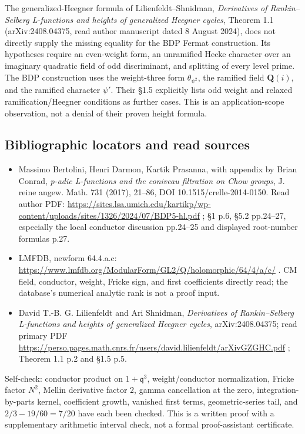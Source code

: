 \documentclass[11pt,a4paper]{article}
\providecommand{\tightlist}{\setlength{\itemsep}{0pt}\setlength{\parskip}{0pt}}
\begin{document}
The generalized-Heegner formula of Lilienfeldt--Shnidman,
\emph{Derivatives of Rankin--Selberg L-functions and heights of
generalized Heegner cycles}, Theorem 1.1 (arXiv:2408.04375, read author
manuscript dated 8 August 2024), does not directly supply the missing
equality for the BDP Fermat construction. Its hypotheses require an
even-weight form, an unramified Hecke character over an imaginary
quadratic field of odd discriminant, and splitting of every level prime.
The BDP construction uses the weight-three form \(\theta_{\psi^2}\), the
ramified field \(\mathbf Q(i)\), and the ramified character \(\psi'\).
Their §1.5 explicitly lists odd weight and relaxed ramification/Heegner
conditions as further cases. This is an application-scope observation,
not a denial of their proven height formula.

\subsection{Bibliographic locators and read
sources}\label{bibliographic-locators-and-read-sources}

\begin{itemize}
\tightlist
\item
  Massimo Bertolini, Henri Darmon, Kartik Prasanna, with appendix by
  Brian Conrad, \emph{p-adic L-functions and the coniveau filtration on
  Chow groups}, J. reine angew. Math. 731 (2017), 21--86, DOI
  10.1515/crelle-2014-0150. Read author PDF:
  \url{https://sites.lsa.umich.edu/kartikp/wp-content/uploads/sites/1326/2024/07/BDP5-hl.pdf}
  ; §1 p.6, §5.2 pp.24--27, especially the local conductor discussion
  pp.24--25 and displayed root-number formulas p.27.
\item
  LMFDB, newform 64.4.a.c:
  \url{https://www.lmfdb.org/ModularForm/GL2/Q/holomorphic/64/4/a/c/} . CM
  field, conductor, weight, Fricke sign, and first coefficients directly
  read; the database's numerical analytic rank is not a proof input.
\item
  David T.-B. G. Lilienfeldt and Ari Shnidman, \emph{Derivatives of
  Rankin--Selberg L-functions and heights of generalized Heegner
  cycles}, arXiv:2408.04375; read primary PDF
  \url{https://perso.pages.math.cnrs.fr/users/david.lilienfeldt/arXivGZGHC.pdf}
  ; Theorem 1.1 p.2 and §1.5 p.5.
\end{itemize}

Self-check: conductor product on \(1+\mathfrak q^3\), weight/conductor
normalization, Fricke factor \(N^2\), Mellin derivative factor \(2\),
gamma cancellation at the zero, integration-by-parts kernel, coefficient
growth, vanished first terms, geometric-series tail, and
\(2/3-19/60=7/20\) have each been checked. This is a written proof with
a supplementary arithmetic interval check, not a formal proof-assistant
certificate.
\end{document}

